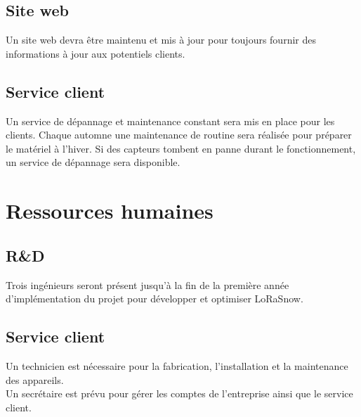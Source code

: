 \subsection{Site web}
Un site web devra être maintenu et mis à jour pour toujours fournir
des informations à jour aux potentiels clients.

\subsection{Service client}
Un service de dépannage et maintenance constant sera mis en place pour
les clients. Chaque automne une maintenance de routine sera réalisée
pour préparer le matériel à l'hiver. Si des capteurs tombent en panne
durant le fonctionnement, un service de dépannage sera disponible.

\section{Ressources humaines}
\subsection{R\&D}
Trois ingénieurs seront présent jusqu'à la fin de la première année
d'implémentation du projet pour développer et optimiser LoRaSnow.

\subsection{Service client}
Un technicien est nécessaire pour la fabrication,
l'installation et la maintenance des appareils.\\
Un secrétaire est prévu pour gérer les comptes de l'entreprise
ainsi que le service client.
